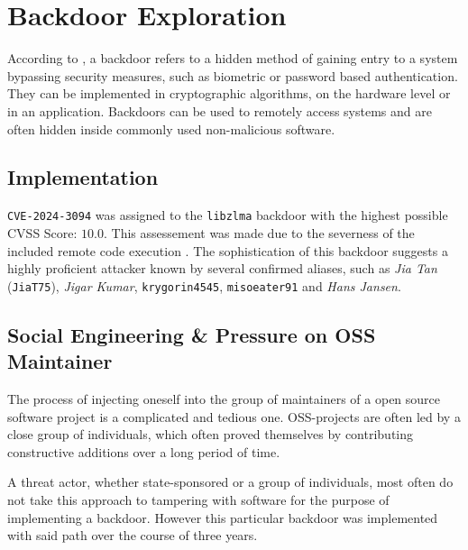 \section{Backdoor Exploration}

According to \cite{wysopal2007static}, a backdoor refers to a hidden method of
gaining entry to a system bypassing security measures, such as biometric or
password based authentication. They can be implemented in cryptographic
algorithms, on the hardware level or in an application. Backdoors can be used
to remotely access systems and are often hidden inside commonly used
non-malicious software.

\subsection{Implementation}

\texttt{CVE-2024-3094} was assigned to the \texttt{libzlma} backdoor with the
highest possible CVSS Score: $10.0$. This assessement was made due to the
severness of the included remote code execution \cite{redhat2024cve}. The
sophistication of this backdoor suggests a highly proficient attacker known by
several confirmed aliases, such as \textit{Jia Tan} (\texttt{JiaT75}),
\textit{Jigar Kumar}, \texttt{krygorin4545}, \texttt{misoeater91} and
\textit{Hans Jansen}.

\subsection{Social Engineering \& Pressure on OSS Maintainer}

The process of injecting oneself into the group of maintainers of a open source
software project is a complicated and tedious one. OSS-projects are often led
by a close group of individuals, which often proved themselves by contributing
constructive additions over a long period of time.

A threat actor, whether state-sponsored or a group of individuals, most often
do not take this approach to tampering with software for the purpose of
implementing a backdoor. However this particular backdoor was implemented with
said path over the course of three years.

